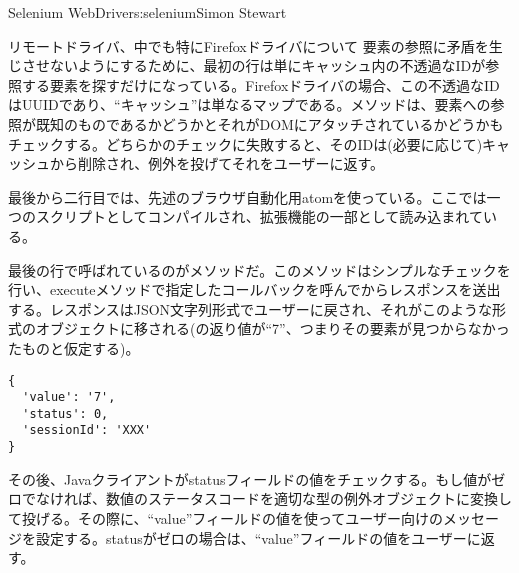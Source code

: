 \begin{aosachapter}{Selenium WebDriver}{s:selenium}{Simon Stewart}
\begin{aosasect1}{リモートドライバ、中でも特にFirefoxドライバについて}
\noindent 要素の参照に矛盾を生じさせないようにするために、最初の行は単にキャッシュ内の不透過なIDが参照する要素を探すだけになっている。Firefoxドライバの場合、この不透過なIDはUUIDであり、``キャッシュ''は単なるマップである。メソッドは、要素への参照が既知のものであるかどうかとそれがDOMにアタッチされているかどうかもチェックする。どちらかのチェックに失敗すると、そのIDは(必要に応じて)キャッシュから削除され、例外を投げてそれをユーザーに返す。

最後から二行目では、先述のブラウザ自動化用atomを使っている。ここでは一つのスクリプトとしてコンパイルされ、拡張機能の一部として読み込まれている。

最後の行で呼ばれているのがメソッドだ。このメソッドはシンプルなチェックを行い、executeメソッドで指定したコールバックを呼んでからレスポンスを送出する。レスポンスはJSON文字列形式でユーザーに戻され、それがこのような形式のオブジェクトに移される(の返り値が``7''、つまりその要素が見つからなかったものと仮定する)。

\begin{verbatim}
{
  'value': '7',
  'status': 0,
  'sessionId': 'XXX'
}
\end{verbatim}

その後、Javaクライアントがstatusフィールドの値をチェックする。もし値がゼロでなければ、数値のステータスコードを適切な型の例外オブジェクトに変換して投げる。その際に、``value''フィールドの値を使ってユーザー向けのメッセージを設定する。statusがゼロの場合は、``value''フィールドの値をユーザーに返す。


\end{aosasect1}
\end{aosachapter}
